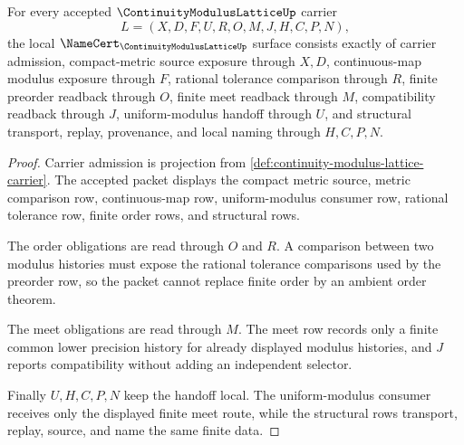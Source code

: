 \begin{theorem}
\label{thm:continuity-modulus-lattice-namecert-obligations}
For every accepted $\ContinuityModulusLatticeUp$ carrier
$$
L=(X,D,F,U,R,O,M,J,H,C,P,N),
$$
the local $\NameCert_{\ContinuityModulusLatticeUp}$ surface consists exactly of carrier admission, compact-metric source exposure through $X,D$, continuous-map modulus exposure through $F$, rational tolerance comparison through $R$, finite preorder readback through $O$, finite meet readback through $M$, compatibility readback through $J$, uniform-modulus handoff through $U$, and structural transport, replay, provenance, and local naming through $H,C,P,N$.
\end{theorem}
\begin{proof}
Carrier admission is projection from \autoref{def:continuity-modulus-lattice-carrier}. The accepted packet displays the compact metric source, metric comparison row, continuous-map row, uniform-modulus consumer row, rational tolerance row, finite order rows, and structural rows.

The order obligations are read through $O$ and $R$. A comparison between two modulus histories must expose the rational tolerance comparisons used by the preorder row, so the packet cannot replace finite order by an ambient order theorem.

The meet obligations are read through $M$. The meet row records only a finite common lower precision history for already displayed modulus histories, and $J$ reports compatibility without adding an independent selector.

Finally $U,H,C,P,N$ keep the handoff local. The uniform-modulus consumer receives only the displayed finite meet route, while the structural rows transport, replay, source, and name the same finite data.
\end{proof}

